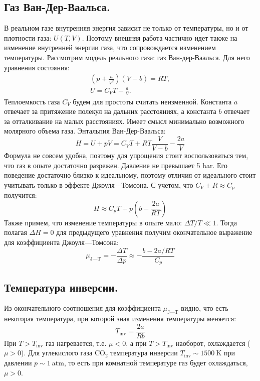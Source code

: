 \documentclass[a4paper,12pt]{report}
\begin{document}
\begin{multicols}{2}
        \subsection*{Газ Ван-Дер-Ваальса.} В реальном газе внутренняя энергия зависит не только от температуры, но и от плотности газа: $U(T,V)$. Поэтому внешняя работа частично идет также на изменение внутренней энергии газа, что сопровождается изменением температуры. Рассмотрим модель реального газа: газ Ван-дер-Ваальса. Для него уравнения состояния:
        \begin{gather*}
            \left(p+\frac{a}{V^2}\right)(V-b)=RT,\\ 
            U=C_V T - \frac{a}{V}.
        \end{gather*}  
        Теплоемкость газа $C_V$ будем для простоты считать неизменной. Константа $a$ отвечает за притяжение полекул на дальних расстояниях, а константа $b$ отвечает за отталкивание на малых расстояниях. Имеет смысл минимально возможного молярного объема газа. Энтальпия Ван-Дер-Ваальса:
        \begin{equation}
            H=U+pV=C_V T + RT \frac{V}{V-b}-\frac{2a}{V}
        \end{equation}
        Формула не совсем удобна, поэтому для упрощения стоит воспользоваться тем, что газ в опыте достаточно разрежен. Давление не превышает 5 bar. Его поведение достаточно близко к идеальному, поэтому отличия от идеального стоит учитывать только в эффекте Джоуля---Томсона. С учетом, что $C_V+R\approx C_p$ получится:
        \begin{equation}
            H \approx C_p T + p \left(b-\frac{2a}{RT}\right)
        \end{equation}
        Также примем, что изменение температуры в опыте мало: $\Delta T/T \ll 1$. Тогда полагая $\Delta H = 0$ для предыдущего уравнения получим окончательное выражение для коэффициента Джоуля---Томсона:
        \begin{equation}
            \label{j-tfinal}
            \mu_{\text{J---T}}=-\frac{\Delta T}{\Delta p}\approx -\frac{b-2a/RT}{C_p}
        \end{equation}
        \subsection*{Температура инверсии.} Из окончательного соотношения для коэффициента $\mu_{\text{J---T}}$ видно, что есть некоторая температура, при которой знак изменения температуры меняется:
        \begin{equation*}
            T_\text{inv}=\frac{2a}{Rb}
        \end{equation*}
        При $T>T_\text{inv}$ газ нагревается, т.е. $\mu < 0$, а при $T>T_\text{inv}$ наоборот, охлаждается ($\mu > 0$). Для углекислого газа $\text{CO}_2$ температура инверсии $T_\text{inv}\sim 1500\ \text{K}$ при давлении $p \sim 1 \ \text{atm}$, то есть при комнатной температуре газ будет охлаждаться, $\mu > 0$.
    \end{multicols}
    \newpage
\end{document}
